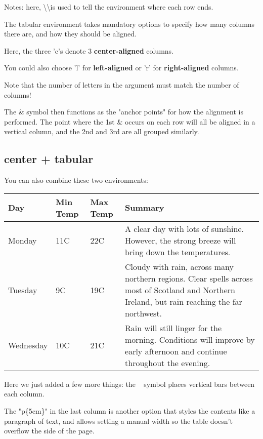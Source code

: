 \documentclass{article}
\begin{document}
        Notes: here, \textbackslash\textbackslash is used to tell the environment where each row ends.

        The tabular environment takes mandatory options to specify how many columns there are, and how they should be aligned.

        Here, the three 'c's denote 3 \textbf{center-aligned} columns.

        You could also choose 'l' for \textbf{left-aligned} or 'r' for \textbf{right-aligned} columns.

        Note that the number of letters in the argument must match the number of columns!

        The \& symbol then functions as the "anchor points" for how the alignment is performed. The point where the 1st \& occurs on each row will all be aligned in a vertical column, and the 2nd and 3rd are all grouped similarly.

    \subsection{center + tabular}
        You can also combine these two environments:

        \begin{center}
            \begin{tabular}{| l | l | l | p{5cm} |}
            \hline
            Day & Min Temp & Max Temp & Summary \\ \hline
            Monday & 11C & 22C & A clear day with lots of sunshine.
            However, the strong breeze will bring down the temperatures. \\ \hline
            Tuesday & 9C & 19C & Cloudy with rain, across many northern regions. Clear spells
            across most of Scotland and Northern Ireland,
            but rain reaching the far northwest. \\ \hline
            Wednesday & 10C & 21C & Rain will still linger for the morning.
            Conditions will improve by early afternoon and continue
            throughout the evening. \\
            \hline
            \end{tabular}
        \end{center}

        Here we just added a few more things: the \textbar~ symbol places vertical bars between each column.

        The "p\{5cm\}" in the last column is another option that styles the contents like a paragraph of text, and allows setting a manual width so the table doesn't overflow the side of the page.
\end{document}

